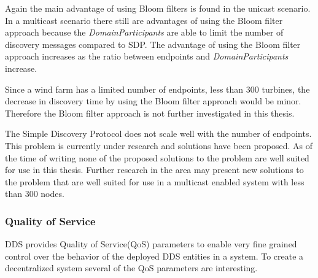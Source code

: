 Again the main advantage of using Bloom filters is found in the unicast scenario. In a multicast scenario there still are advantages of using the Bloom filter approach because the \textit{DomainParticipants} are able to limit the number of discovery messages compared to SDP. The advantage of using the Bloom filter approach increases as the ratio between endpoints and \textit{DomainParticipants} increase.

Since a wind farm has a limited number of endpoints, less than 300 turbines, the decrease in discovery time by using the Bloom filter approach would be minor. Therefore the Bloom filter approach is not further investigated in this thesis. \newline

The Simple Discovery Protocol does not scale well with the number of endpoints. This problem is currently under research and solutions have been proposed. As of the time of writing none of the proposed solutions to the problem are well suited for use in this thesis. Further research in the area may present new solutions to the problem that are well suited for use in a multicast enabled system with less than 300 nodes.

\subsubsection{Quality of Service}
DDS provides Quality of Service(QoS) parameters to enable very fine grained control over the behavior of the deployed DDS entities in a system. To create a decentralized system several of the QoS parameters are interesting.


